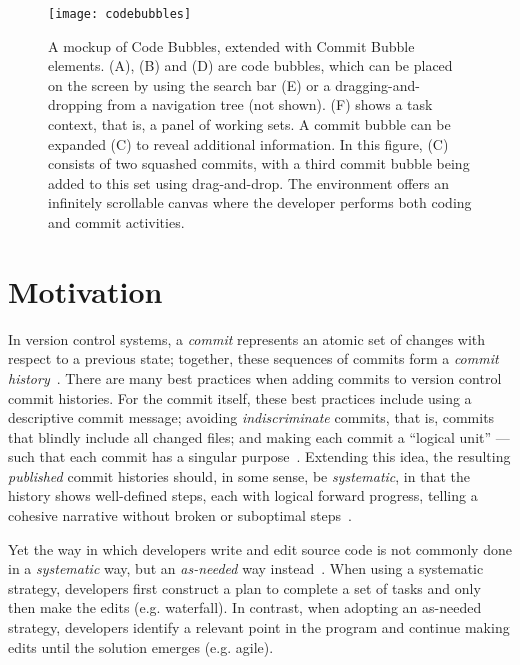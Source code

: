 \documentclass[conference]{IEEEtran}
\newcommand{\purpose}[1]{}
\begin{document}
\begin{figure*}
\centering
\texttt{[image: codebubbles]}
\caption{A mockup of Code Bubbles, extended with Commit Bubble elements. 
(A), (B) and (D) are code bubbles, which can be placed on the screen by using the search bar (E) or a dragging-and-dropping from a navigation tree (not shown). 
(F) shows a task context, that is, a panel of working sets.
A commit bubble can be expanded (C) to reveal additional information. 
In this figure, (C) consists of two squashed commits, with a third commit bubble being added to this set using drag-and-drop. 
The environment offers an infinitely scrollable canvas where the developer performs both coding and commit activities.}
\label{fig:eclipse}
\end{figure*}

\section{Motivation}

\purpose{Best practices for version control commit messages.} 
In version control systems, a \emph{commit} represents an atomic set of changes with respect to a previous state; together, these sequences of commits form a \emph{commit history}~\cite{Loeliger2012}.
There are many best practices when adding commits to version control commit histories. 
For the commit itself, these best practices include using a descriptive commit message; 
avoiding \emph{indiscriminate} commits, that is, commits that blindly include all changed files; and making each commit a ``logical unit'' --- such that 
each commit has a singular purpose~\cite{GitBestPractices}.
Extending this idea, the resulting \emph{published} commit histories should, in some sense, be \emph{systematic}, 
in that the history shows well-defined steps, each with logical forward progress, telling a cohesive narrative without 
broken or suboptimal steps~\cite{Loeliger2012}.

\purpose{Coding activities use a different model than what VCS requires.} 
Yet the way in which developers write and edit source code is not commonly done in a \emph{systematic} way, but an \emph{as-needed} way instead~\cite{Perry1989,Littman1987}. 
When using a systematic strategy, developers first construct a plan to complete a set of tasks and only then make the edits (e.g. waterfall).
In contrast, when adopting an as-needed strategy, developers identify a relevant point in the program and continue making edits until the solution emerges (e.g. agile).
\end{document}
